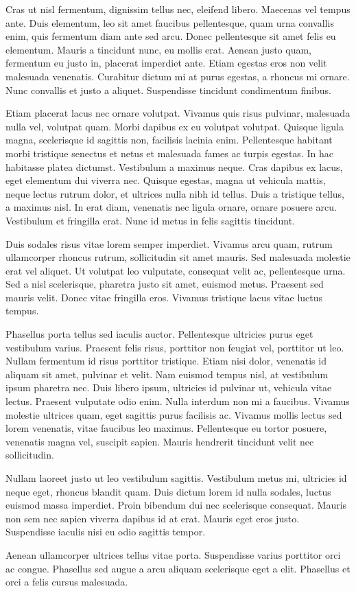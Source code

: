 Cras ut nisl fermentum, dignissim tellus nec, eleifend libero. Maecenas vel tempus ante. Duis elementum, leo sit amet faucibus pellentesque, quam urna convallis enim, quis fermentum diam ante sed arcu. Donec pellentesque sit amet felis eu elementum. Mauris a tincidunt nunc, eu mollis erat. Aenean justo quam, fermentum eu justo in, placerat imperdiet ante. Etiam egestas eros non velit malesuada venenatis. Curabitur dictum mi at purus egestas, a rhoncus mi ornare. Nunc convallis et justo a aliquet. Suspendisse tincidunt condimentum finibus.

Etiam placerat lacus nec ornare volutpat. Vivamus quis risus pulvinar, malesuada nulla vel, volutpat quam. Morbi dapibus ex eu volutpat volutpat. Quisque ligula magna, scelerisque id sagittis non, facilisis lacinia enim. Pellentesque habitant morbi tristique senectus et netus et malesuada fames ac turpis egestas. In hac habitasse platea dictumst. Vestibulum a maximus neque. Cras dapibus ex lacus, eget elementum dui viverra nec. Quisque egestas, magna ut vehicula mattis, neque lectus rutrum dolor, et ultrices nulla nibh id tellus. Duis a tristique tellus, a maximus nisl. In erat diam, venenatis nec ligula ornare, ornare posuere arcu. Vestibulum et fringilla erat. Nunc id metus in felis sagittis tincidunt.

Duis sodales risus vitae lorem semper imperdiet. Vivamus arcu quam, rutrum ullamcorper rhoncus rutrum, sollicitudin sit amet mauris. Sed malesuada molestie erat vel aliquet. Ut volutpat leo vulputate, consequat velit ac, pellentesque urna. Sed a nisl scelerisque, pharetra justo sit amet, euismod metus. Praesent sed mauris velit. Donec vitae fringilla eros. Vivamus tristique lacus vitae luctus tempus.

Phasellus porta tellus sed iaculis auctor. Pellentesque ultricies purus eget vestibulum varius. Praesent felis risus, porttitor non feugiat vel, porttitor ut leo. Nullam fermentum id risus porttitor tristique. Etiam nisi dolor, venenatis id aliquam sit amet, pulvinar et velit. Nam euismod tempus nisl, at vestibulum ipsum pharetra nec. Duis libero ipsum, ultricies id pulvinar ut, vehicula vitae lectus. Praesent vulputate odio enim. Nulla interdum non mi a faucibus. Vivamus molestie ultrices quam, eget sagittis purus facilisis ac. Vivamus mollis lectus sed lorem venenatis, vitae faucibus leo maximus. Pellentesque eu tortor posuere, venenatis magna vel, suscipit sapien. Mauris hendrerit tincidunt velit nec sollicitudin.

Nullam laoreet justo ut leo vestibulum sagittis. Vestibulum metus mi, ultricies id neque eget, rhoncus blandit quam. Duis dictum lorem id nulla sodales, luctus euismod massa imperdiet. Proin bibendum dui nec scelerisque consequat. Mauris non sem nec sapien viverra dapibus id at erat. Mauris eget eros justo. Suspendisse iaculis nisi eu odio sagittis tempor.

Aenean ullamcorper ultrices tellus vitae porta. Suspendisse varius porttitor orci ac congue. Phasellus sed augue a arcu aliquam scelerisque eget a elit. Phasellus et orci a felis cursus malesuada. 